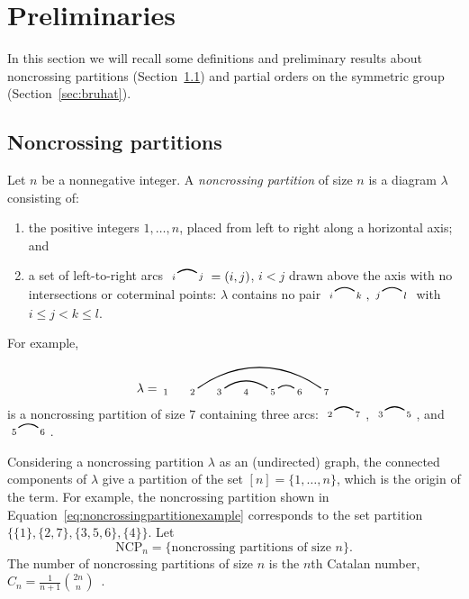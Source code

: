 \documentclass[12pt]{amsart}
\theoremstyle{definition}
\theoremstyle{remark}
\numberwithin{equation}{section}
\newcommand{\NCP}{\mathrm{NCP}}
\newcommand{\edge}[2]{\tikz[scale = 0.75, baseline = -0.2cm]{
\draw (0.1, 0) node[inner sep = 0ex] (a) {};
\node[left, xshift = 0.1cm, yshift = -0.1cm] at (a) {$\scriptstyle #1$};
\draw (0.9, 0)  node[inner sep = 0ex] (b) {};
\node[right, xshift = -0.1cm, yshift = -0.1cm] at (b) {$\scriptstyle #2$};
\draw[thick] (a) to[out = 35, in = 145] (b);}}
\begin{document}
\section{Preliminaries}

In this section we will recall some definitions and preliminary results about noncrossing partitions (Section~\ref{sec:ncp}) and partial orders on the symmetric group (Section~\ref{sec:bruhat}).

\subsection{Noncrossing partitions}
\label{sec:ncp}

Let $n$ be a nonnegative integer.  A \emph{noncrossing partition} of size $n$ is a diagram $\lambda$ consisting of:
\begin{enumerate}
\item the positive integers $1, \ldots, n$, placed from left to right along a horizontal axis; and

\item a set of left-to-right arcs $\edge{i}{j} = (i, j)$, $i < j$ drawn above the axis with no intersections or coterminal points: $\lambda$ contains no pair $\edge{i}{k}, \edge{j}{l}$ with $i \le j < k \le l$.

\end{enumerate}
For example,
\begin{equation}
\label{eq:noncrossingpartitionexample}
\lambda = \begin{tikzpicture}[scale = 0.75, baseline = 0.75*-0.2]
\foreach \x in {1, ..., 7}{\draw[fill] (\x - 1, 0) node[inner sep = 2pt] (\x) {$\scriptstyle \x$};}
\foreach \i\j in {5/6, 3/5,2/7}{\draw[thick] (\i) to[out = 35, in = 145] (\j);}
\end{tikzpicture}
\end{equation}
is a noncrossing partition of size $7$ containing three arcs: $\edge{2}{7}$, $\edge{3}{5}$, and $\edge{5}{6}$.

Considering a noncrossing partition $\lambda$ as an (undirected) graph, the connected components of $\lambda$ give a partition of the set $[n] = \{1, \ldots, n\}$, which is the origin of the term.  For example, the noncrossing partition shown in Equation~\eqref{eq:noncrossingpartitionexample} corresponds to the set partition $\big\{ \{1\}, \{2, 7\}, \{3, 5, 6\}, \{4\}  \big\}$.  Let
\[
\NCP_{n} = \{ \text{noncrossing partitions of size $n$} \}.
\]
The number of noncrossing partitions of size $n$ is the $n$th Catalan number, $C_{n} = \frac{1}{n+1}\binom{2n}{n}$~\cite[Exercise 6.19 pp]{Stanley}.
\end{document}
